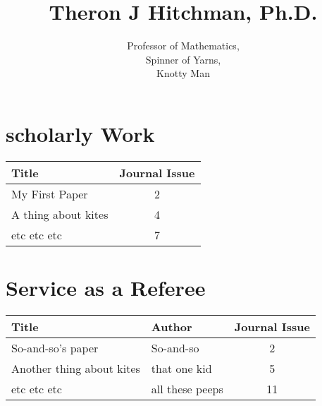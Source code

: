 \documentclass[11pt]{amsart}
\begin{document}
\title{Theron J Hitchman, Ph.D.}
\author{Professor of Mathematics,\\ Spinner of Yarns,\\ Knotty Man}

\maketitle

\begin{center}

\section*{scholarly Work}

\begin{tabular}{l|c}
Title & Journal Issue \\
\hline
\hline
My First Paper & 2 \\
A thing about kites & 4 \\
etc etc etc & 7  
\end{tabular}

\vspace{1in}

\section*{Service as a Referee}

\begin{tabular}{l|l|c}
Title &  Author & Journal Issue \\
\hline
\hline
So-and-so's paper & So-and-so & 2 \\
Another thing about kites & that one kid & 5 \\
etc etc etc & all these peeps & 11  
\end{tabular}

\end{center}
\end{document}
